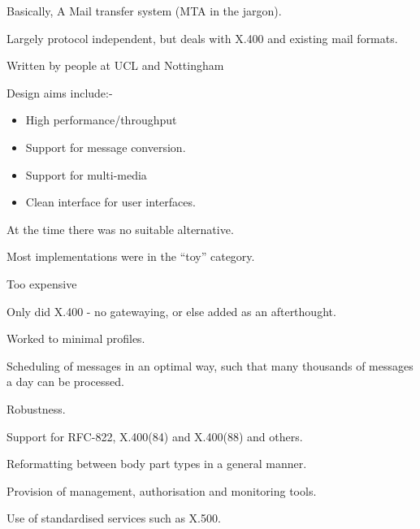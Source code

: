 \begin{bwslide}
\begin{nrtc}
\item	Basically, A Mail transfer system (MTA in the jargon).

\item	Largely protocol independent, but deals with X.400
	and existing mail formats.

\item	Written by people at UCL and Nottingham

\item	Design aims include:-
	\begin{itemize}

	\item	High performance/throughput
	\item	Support for message conversion.
	\item	Support for multi-media
	\item	Clean interface for user interfaces.
	\end{itemize}

\end{nrtc}
\end{bwslide}

\begin{bwslide}
\begin{nrtc}
\item At the time there was no suitable alternative.

\item Most implementations were in the ``toy'' category.

\item Too expensive

\item Only did X.400 - no gatewaying, or else added as an
afterthought.

\item Worked to minimal profiles.
\end{nrtc}
\end{bwslide}

\begin{bwslide}
\begin{nrtc}
\item	Scheduling of messages in an optimal way, such that many
thousands of messages a day can be processed.

\item	Robustness.

\item	Support for RFC-822, X.400(84) and X.400(88) and others.

\item	Reformatting between body part types in a general manner.

\item	Provision of management, authorisation and monitoring tools.

\item	Use of standardised services such as X.500.
\end{nrtc}
\end{bwslide}

